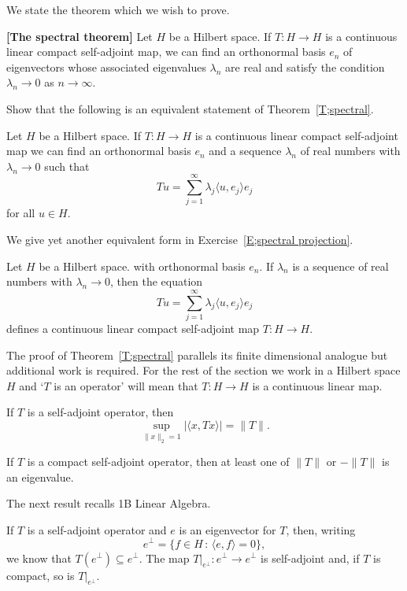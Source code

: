 We state the theorem which we wish to prove.
\begin{theorem}{\bf [The spectral theorem]}\label{T;spectral}
Let $H$ be a Hilbert space. If
$T:H\rightarrow H$ is a continuous linear compact self-adjoint map,
we can find an orthonormal basis $e_{n}$ of eigenvectors
whose associated eigenvalues $\lambda_{n}$ are real and
satisfy the condition
$\lambda_{n}\rightarrow 0$ as $n\rightarrow\infty$.
\end{theorem}
\begin{exercise} Show that the following is an equivalent
statement of Theorem~\ref{T;spectral}.

Let $H$ be a Hilbert space. If
$T:H\rightarrow H$ is a continuous linear compact self-adjoint map
we can find an orthonormal basis $e_{n}$ and a sequence $\lambda_{n}$
of real numbers with $\lambda_{n}\rightarrow 0$ such that
\[Tu=\sum_{j=1}^{\infty}\lambda_{j}\langle u,e_{j}\rangle e_{j}\]
for all $u\in H$.
\end{exercise}
We give yet another equivalent form in 
Exercise~\ref{E;spectral projection}.
\begin{exercise} Let $H$ be a Hilbert space.
with orthonormal basis $e_{n}$. If $\lambda_{n}$ is a sequence
of real numbers with $\lambda_{n}\rightarrow 0$, then
the equation
\[Tu=\sum_{j=1}^{\infty}\lambda_{j}\langle u,e_{j}\rangle e_{j}\]
defines a  continuous linear compact self-adjoint map
$T:H\rightarrow H$.
\end{exercise}
The proof of Theorem~\ref{T;spectral} parallels its finite dimensional
analogue but additional work is required. For the rest of the section
we work in a Hilbert space $H$ and `$T$ is an operator'
will mean that $T:H\rightarrow H$ is a continuous linear map.
\begin{lemma} If $T$ is a self-adjoint operator, then
\[\sup_{\|x\|_{2}=1}|\langle x,Tx\rangle|=\|T\|.\]
\end{lemma}
\begin{lemma} If $T$ is a compact self-adjoint operator, then
at least one of $\|T\|$ or $-\|T\|$ is an eigenvalue.
\end{lemma}
The next result recalls 1B Linear Algebra.
\begin{exercise} If $T$ is a self-adjoint operator
and $e$ is an eigenvector for $T$, then, writing
\[e^{\perp}=\{f\in H\,:\,\langle e,f\rangle=0\},\]
we know that $T(e^{\perp})\subseteq e^{\perp}$.
The map $T|_{e^{\perp}}:e^{\perp}\rightarrow e^{\perp}$
is self-adjoint and, if $T$ is compact, so is $T|_{e^{\perp}}$.
\end{exercise}
